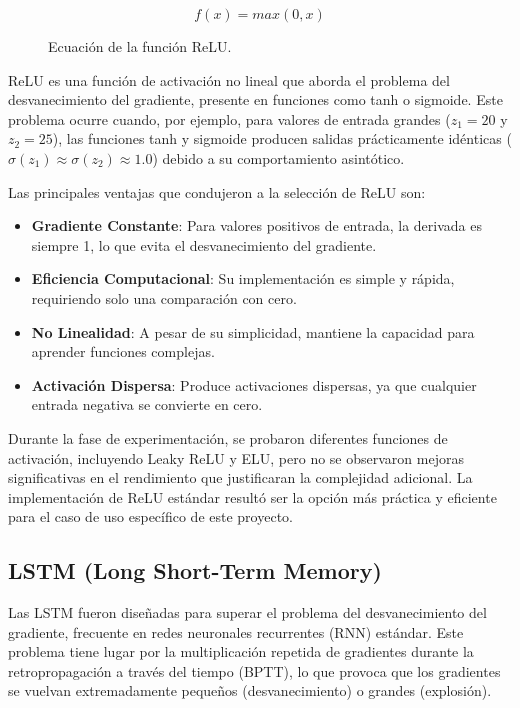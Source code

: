 \begin{figure}[h!]
    \centering
    \begin{equation}
        f(x) = max(0, x)
    \end{equation}
    \caption{Ecuación de la función ReLU.}
    \label{fig:relu_equation}
\end{figure}

ReLU es una función de activación no lineal que aborda el problema del desvanecimiento del gradiente, presente en funciones como tanh o sigmoide. Este problema ocurre cuando, por ejemplo, para valores de entrada grandes ($z_1 = 20$ y $z_2 = 25$), las funciones tanh y sigmoide producen salidas prácticamente idénticas ($\sigma(z_1) \approx \sigma(z_2) \approx 1.0$) debido a su comportamiento asintótico.

Las principales ventajas que condujeron a la selección de ReLU son:

\begin{itemize}
    \item \textbf{Gradiente Constante}: Para valores positivos de entrada, la derivada es siempre 1, lo que evita el desvanecimiento del gradiente.
    \item \textbf{Eficiencia Computacional}: Su implementación es simple y rápida, requiriendo solo una comparación con cero.
    \item \textbf{No Linealidad}: A pesar de su simplicidad, mantiene la capacidad para aprender funciones complejas.
    \item \textbf{Activación Dispersa}: Produce activaciones dispersas, ya que cualquier entrada negativa se convierte en cero.
\end{itemize}

Durante la fase de experimentación, se probaron diferentes funciones de activación, incluyendo Leaky ReLU y ELU, pero no se observaron mejoras significativas en el rendimiento que justificaran la complejidad adicional. La implementación de ReLU estándar resultó ser la opción más práctica y eficiente para el caso de uso específico de este proyecto.

\subsection{LSTM (Long Short-Term Memory)}

Las LSTM fueron diseñadas para superar el problema del desvanecimiento del gradiente, frecuente en redes neuronales recurrentes (RNN) estándar. Este problema tiene lugar por la multiplicación repetida de gradientes durante la retropropagación a través del tiempo (BPTT), lo que provoca que los gradientes se vuelvan extremadamente pequeños (desvanecimiento) o grandes (explosión).

